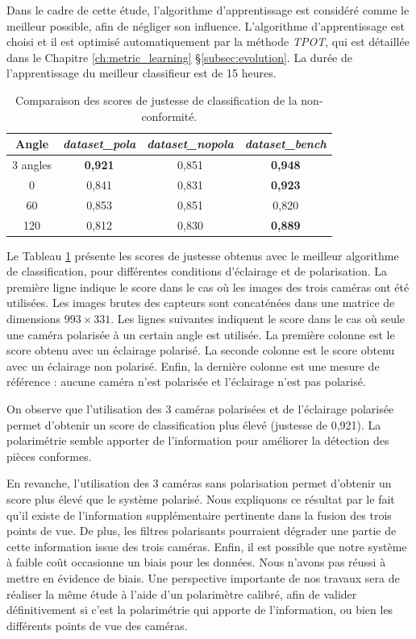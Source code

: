 Dans le cadre de cette étude, l'algorithme d'apprentissage est considéré comme le meilleur possible, afin de négliger son influence.
L'algorithme d'apprentissage est choisi et il est optimisé automatiquement par la méthode \textit{TPOT}, qui est détaillée dans le Chapitre \ref{ch:metric_learning} §\ref{subsec:evolution}.
La durée de l'apprentissage du meilleur classifieur est de 15 heures.

\begin{table}[hbtp]
	\begin{center} 
		\begin{tabular}{|c|c|c|c|}
			\hline
			Angle & \textit{dataset\_pola} & \textit{dataset\_nopola} & \textit{dataset\_bench}\\
			\hline
			\hline
			3 angles   & \textbf{0,921} & 0,851 & \textbf{0,948} \\
			0\degree   &         0,841  & 0,831 & \textbf{0,923} \\
			60\degree  &         0,853  & 0,851 &         0,820  \\
			120\degree &         0,812  & 0,830 & \textbf{0,889} \\
			\hline
		\end{tabular}
	\end{center}
	\caption{Comparaison des scores de justesse de classification de la non-conformité.}
	\label{tab:perfAutoML}
\end{table}

Le Tableau \ref{tab:perfAutoML} présente les scores de justesse obtenus avec le meilleur algorithme de classification, pour différentes conditions d'éclairage et de polarisation.
La première ligne indique le score dans le cas où les images des trois caméras ont été utilisées.
Les images brutes des capteurs sont concaténées dans une matrice de dimensions $993\times 331$.
Les lignes suivantes indiquent le score dans le cas où seule une caméra polarisée à un certain angle est utilisée.
La première colonne est le score obtenu avec un éclairage polarisé.
La seconde colonne est le score obtenu avec un éclairage non polarisé.
Enfin, la dernière colonne est une mesure de référence : aucune caméra n'est polarisée et l'éclairage n'est pas polarisé.

On observe que l'utilisation des 3 caméras polarisées et de l'éclairage polarisée permet d'obtenir un score de classification plus élevé (justesse de 0,921).
La polarimétrie semble apporter de l'information pour améliorer la détection des pièces conformes.

En revanche, l'utilisation des 3 caméras sans polarisation permet d'obtenir un score plus élevé que le système polarisé.
Nous expliquons ce résultat par le fait qu'il existe de l'information supplémentaire pertinente dans la fusion des trois points de vue.
De plus, les filtres polarisants pourraient dégrader une partie de cette information issue des trois caméras.
Enfin, il est possible que notre système à faible coût occasionne un biais pour les données.
Nous n'avons pas réussi à mettre en évidence de biais.
Une perspective importante de nos travaux sera de réaliser la même étude à l'aide d'un polarimètre calibré, afin de valider définitivement si c'est la polarimétrie qui apporte de l'information, ou bien les différents points de vue des caméras.

